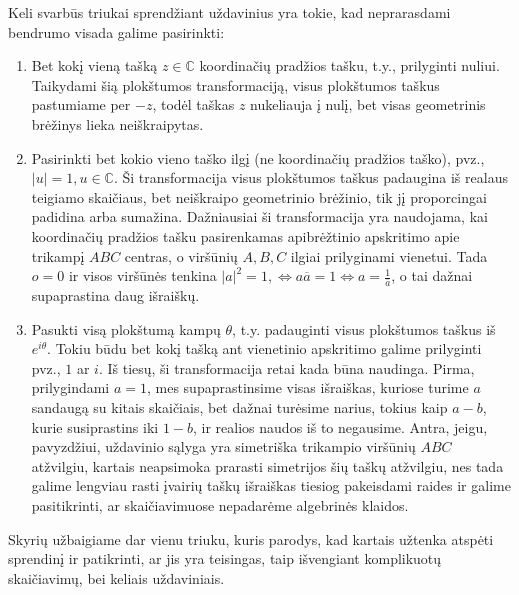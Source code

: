 \documentclass[11pt,a4paper,twoside]{book}
\theoremstyle{definition} \newtheorem*{api}{Apibrėžimas}
\theoremstyle{remark} \newtheorem*{pastaba}{Pastaba}
\begin{document}
Keli svarbūs triukai sprendžiant uždavinius yra tokie, kad neprarasdami bendrumo visada galime pasirinkti:
\begin{enumerate}
\item Bet kokį vieną tašką $z \in \mathbb{C}$ koordinačių pradžios tašku, t.y., prilyginti nuliui. Taikydami šią plokštumos transformaciją, visus plokštumos taškus pastumiame per $-z$, todėl taškas $z$ nukeliauja į nulį, bet visas geometrinis brėžinys lieka neiškraipytas.
\item Pasirinkti bet kokio vieno taško ilgį (ne koordinačių pradžios taško), pvz., $|u|=1, u \in \mathbb{C}$. Ši transformacija visus plokštumos taškus padaugina iš realaus teigiamo skaičiaus, bet neiškraipo geometrinio brėžinio, tik jį proporcingai padidina arba sumažina. Dažniausiai ši transformacija yra naudojama, kai koordinačių pradžios tašku pasirenkamas apibrėžtinio apskritimo apie trikampį $ABC$ centras, o viršūnių $A, B, C$ ilgiai prilyginami vienetui. Tada $o=0$ ir visos viršūnės tenkina $|a|^2=1, \Leftrightarrow a\overline{a}=1 \Leftrightarrow a =\frac{1}{\overline{a}}$, o tai dažnai supaprastina daug išraiškų.
\item Pasukti visą plokštumą kampų $\theta$, t.y. padauginti visus plokštumos taškus iš $e^{i\theta}$. Tokiu būdu bet kokį tašką ant vienetinio apskritimo galime prilyginti pvz., $1$ ar $i$. Iš tiesų, ši transformacija retai kada būna naudinga. Pirma, prilygindami $a=1$, mes supaprastinsime visas išraiškas, kuriose turime $a$ sandaugą su kitais skaičiais, bet dažnai turėsime narius, tokius kaip $a-b$, kurie susiprastins iki $1-b$, ir realios naudos iš to negausime. Antra, jeigu, pavyzdžiui, uždavinio sąlyga yra simetriška trikampio viršūnių $ABC$ atžvilgiu, kartais neapsimoka prarasti simetrijos šių taškų atžvilgiu, nes tada galime lengviau rasti įvairių taškų išraiškas tiesiog pakeisdami raides ir galime pasitikrinti, ar skaičiavimuose nepadarėme algebrinės klaidos.
\end{enumerate}


Skyrių užbaigiame dar vienu triuku, kuris parodys, kad kartais užtenka atspėti sprendinį ir patikrinti, ar jis yra teisingas, taip išvengiant komplikuotų skaičiavimų, bei keliais uždaviniais.
\end{document}
